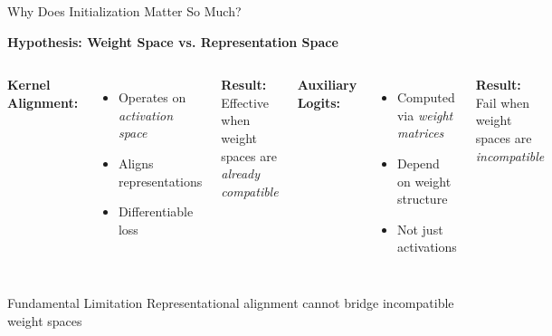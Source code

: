 \documentclass{beamer}
\begin{document}
\begin{frame}{Why Does Initialization Matter So Much?}

\textbf{Hypothesis: Weight Space vs. Representation Space}

\vspace{1em}

\begin{columns}
\textbf{Kernel Alignment:}
\begin{itemize}
    \item Operates on \emph{activation space}
    \item Aligns representations
    \item Differentiable loss
\end{itemize}

\vspace{1em}

\textbf{Result:} Effective when weight spaces are \emph{already compatible}

\textbf{Auxiliary Logits:}
\begin{itemize}
    \item Computed via \emph{weight matrices}
    \item Depend on weight structure
    \item Not just activations
\end{itemize}

\vspace{1em}

\textbf{Result:} Fail when weight spaces are \emph{incompatible}
\end{columns}

\vspace{1em}

\begin{alertblock}{Fundamental Limitation}
Representational alignment cannot bridge incompatible weight spaces
\end{alertblock}

\end{frame}
\end{document}
